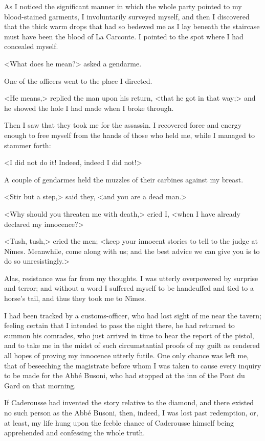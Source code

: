 As I noticed the significant manner in which the whole party pointed to my blood-stained garments, I involuntarily surveyed myself, and then I discovered that the thick warm drops that had so bedewed me as I lay beneath the staircase must have been the blood of La Carconte. I pointed to the spot where I had concealed myself. 

<What does he mean?> asked a gendarme. 

One of the officers went to the place I directed. 

<He means,> replied the man upon his return, <that he got in that way;> and he showed the hole I had made when I broke through. 

Then I saw that they took me for the assassin. I recovered force and energy enough to free myself from the hands of those who held me, while I managed to stammer forth: 

<I did not do it! Indeed, indeed I did not!> 

A couple of gendarmes held the muzzles of their carbines against my breast. 

<Stir but a step,> said they, <and you are a dead man.> 

<Why should you threaten me with death,> cried I, <when I have already declared my innocence?> 

<Tush, tush,> cried the men; <keep your innocent stories to tell to the judge at Nîmes. Meanwhile, come along with us; and the best advice we can give you is to do so unresistingly.> 

Alas, resistance was far from my thoughts. I was utterly overpowered by surprise and terror; and without a word I suffered myself to be handcuffed and tied to a horse's tail, and thus they took me to Nîmes. 

I had been tracked by a customs-officer, who had lost sight of me near the tavern; feeling certain that I intended to pass the night there, he had returned to summon his comrades, who just arrived in time to hear the report of the pistol, and to take me in the midst of such circumstantial proofs of my guilt as rendered all hopes of proving my innocence utterly futile. One only chance was left me, that of beseeching the magistrate before whom I was taken to cause every inquiry to be made for the Abbé Busoni, who had stopped at the inn of the Pont du Gard on that morning. 

If Caderousse had invented the story relative to the diamond, and there existed no such person as the Abbé Busoni, then, indeed, I was lost past redemption, or, at least, my life hung upon the feeble chance of Caderousse himself being apprehended and confessing the whole truth. 

